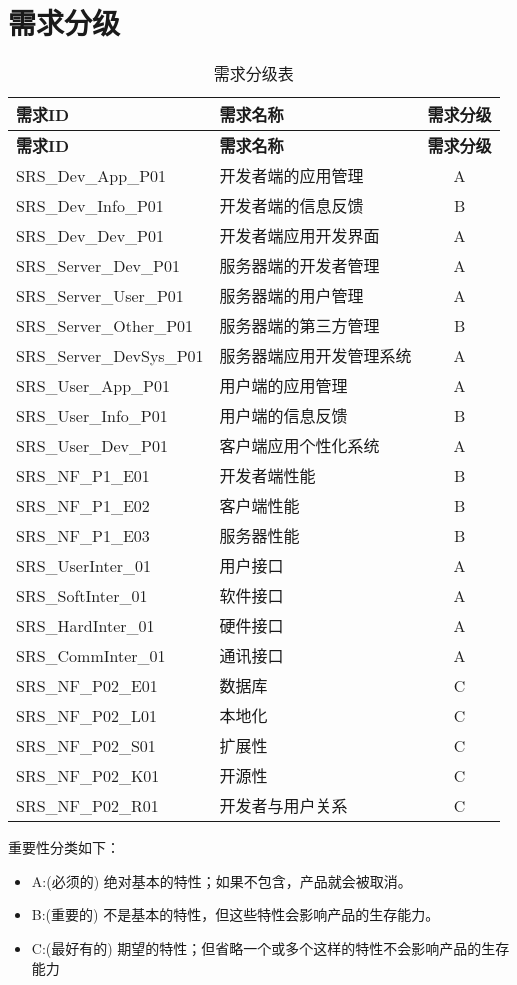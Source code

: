 \chapter{需求分级}

\begin{longtable}{|p{6cm}|p{6cm}|c|}
\caption{需求分级表} \label{tab:classification}\\
\hline
\textbf{需求ID} & \textbf{需求名称} & \textbf{需求分级}\\
\hline
\endfirsthead

\hline
\textbf{需求ID} & \textbf{需求名称} & \textbf{需求分级}\\
\hline
\endhead
\hline 
\endfoot
\hline
\endlastfoot
SRS\_Dev\_App\_P01 & 开发者端的应用管理 & A \\
\hline
SRS\_Dev\_Info\_P01 & 开发者端的信息反馈 & B \\
\hline
{\color{red}SRS\_Dev\_Dev\_P01} & {\color{red}开发者端应用开发界面} & {\color{red}A} \\
\hline
SRS\_Server\_Dev\_P01 & 服务器端的开发者管理 & A \\
\hline
SRS\_Server\_User\_P01 & 服务器端的用户管理 & A \\
\hline
SRS\_Server\_Other\_P01 & 服务器端的第三方管理 & B \\
\hline
{\color{red}SRS\_Server\_DevSys\_P01} & {\color{red}服务器端应用开发管理系统} & {\color{red}A} \\
\hline
SRS\_User\_App\_P01 & 用户端的应用管理 & A \\
\hline
SRS\_User\_Info\_P01 & 用户端的信息反馈 & B \\
\hline
{\color{red}SRS\_User\_Dev\_P01} & {\color{red}客户端应用个性化系统} & {\color{red}A} \\
\hline
SRS\_NF\_P1\_E01 & 开发者端性能 & B \\
\hline
SRS\_NF\_P1\_E02 & 客户端性能 & B \\
\hline
SRS\_NF\_P1\_E03 & 服务器性能 & B \\
\hline
SRS\_UserInter\_01 & 用户接口 & A \\
\hline
SRS\_SoftInter\_01 & 软件接口 & A \\
\hline
SRS\_HardInter\_01 & 硬件接口 & A \\
\hline
SRS\_CommInter\_01 & 通讯接口 & A \\
\hline
SRS\_NF\_P02\_E01 & 数据库 & C \\
\hline
SRS\_NF\_P02\_L01 & 本地化 & C \\
\hline
SRS\_NF\_P02\_S01 & 扩展性 & C \\
\hline
SRS\_NF\_P02\_K01 & 开源性 & C \\
\hline
SRS\_NF\_P02\_R01 & 开发者与用户关系 & C \\
\end{longtable}

重要性分类如下：
\begin{itemize}
\item A:(必须的)		绝对基本的特性；如果不包含，产品就会被取消。
\item B:(重要的)		不是基本的特性，但这些特性会影响产品的生存能力。
\item C:(最好有的)		期望的特性；但省略一个或多个这样的特性不会影响产品的生存能力
\end{itemize}
